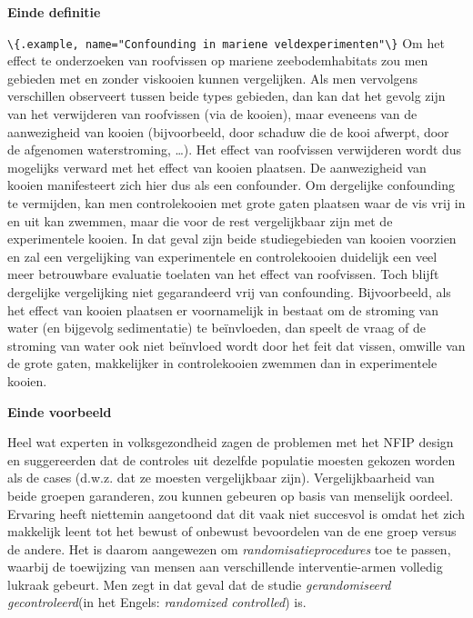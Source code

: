\documentclass[
  12pt,dutch,coursenotes]{book}
\newcommand{\passthrough}[1]{#1}
\begin{document}
\textbf{Einde definitie}

\passthrough{\lstinline!\{.example, name="Confounding in mariene veldexperimenten"\}!}
Om het effect te onderzoeken van roofvissen op mariene zeebodemhabitats zou men gebieden met en zonder viskooien kunnen vergelijken. Als men vervolgens verschillen observeert tussen beide types gebieden, dan kan dat het gevolg zijn van het verwijderen van roofvissen (via de kooien), maar eveneens van de aanwezigheid van kooien (bijvoorbeeld, door schaduw die de kooi afwerpt, door de afgenomen waterstroming, \ldots). Het effect van roofvissen verwijderen wordt dus mogelijks verward met het effect van kooien plaatsen. De aanwezigheid van kooien manifesteert zich hier dus als een confounder. Om dergelijke confounding te vermijden, kan men controlekooien met grote gaten plaatsen waar de vis vrij in en uit kan zwemmen, maar die voor de rest vergelijkbaar zijn met de experimentele kooien. In dat geval zijn beide studiegebieden van kooien voorzien en zal een vergelijking van experimentele en controlekooien duidelijk een veel meer betrouwbare evaluatie toelaten van het effect van roofvissen. Toch blijft dergelijke vergelijking niet gegarandeerd vrij van confounding. Bijvoorbeeld, als het effect van kooien plaatsen er voornamelijk in bestaat om de stroming van water (en bijgevolg sedimentatie) te beïnvloeden, dan speelt de vraag of de stroming van water ook niet beïnvloed wordt door het feit dat vissen, omwille van de grote gaten, makkelijker in controlekooien zwemmen dan in experimentele kooien.

\textbf{Einde voorbeeld}

Heel wat experten in volksgezondheid zagen de problemen met het NFIP design
en suggereerden dat de controles uit dezelfde populatie moesten gekozen
worden als de cases (d.w.z. dat ze moesten vergelijkbaar zijn).
Vergelijkbaarheid van beide groepen garanderen, zou kunnen gebeuren op basis
van menselijk oordeel. Ervaring heeft niettemin aangetoond dat dit vaak niet
succesvol is omdat het zich makkelijk leent tot het bewust of onbewust
bevoordelen van de ene groep versus de andere. Het is daarom aangewezen om
\emph{randomisatieprocedures} toe te passen, waarbij de toewijzing van
mensen aan verschillende interventie-armen volledig lukraak gebeurt. Men
zegt in dat geval dat de studie \emph{gerandomiseerd gecontroleerd}(in
het Engels: \emph{randomized controlled}) is.
\end{document}
